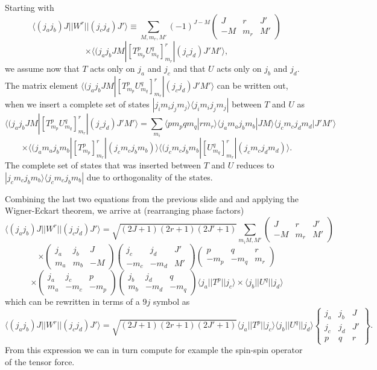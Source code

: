 Starting with
\[
\langle (j_aj_b)J||W^{r}||(j_cj_d)J'\rangle\equiv\sum_{M,m_r,M'}(-1)^{J-M}\left(\begin{array}{ccc}  J & r & J' \\ -M & m_r & M'\end{array}\right)
\]
\[
\times\langle (j_aj_bJM|\left[ T^{p}_{m_p}U^{q}_{m_q} \right]^{r}_{m_r}|(j_cj_d)J'M'\rangle,
\]
we assume now that $T$ acts only on $j_a$ and $j_c$ and that $U$ acts only on $j_b$ and $j_d$. 
The matrix element $\langle (j_aj_bJM|\left[ T^{p}_{m_p}U^{q}_{m_q} \right]^{r}_{m_r}|(j_cj_d)J'M'\rangle$ can be written out,
when we insert a complete set of states $|j_im_ij_jm_j\rangle\langle j_im_ij_jm_j|$ between $T$ and $U$ as
\[
\langle (j_aj_bJM|\left[ T^{p}_{m_p}U^{q}_{m_q} \right]^{r}_{m_r}|(j_cj_d)J'M'\rangle=\sum_{m_i}\langle pm_pqm_q|rm_r\rangle\langle j_am_aj_bm_b|JM\rangle\langle j_cm_cj_dm_d|J'M'\rangle
\]
\[
\times \langle (j_am_aj_bm_b|\left[ T^{p}_{m_p}\right]^{r}_{m_r}|(j_cm_cj_bm_b)\rangle\langle (j_cm_cj_bm_b|\left[ U^{q}_{m_q}\right]^{r}_{m_r}|(j_cm_cj_dm_d)\rangle.
\]
The complete set of states that was inserted between $T$ and $U$ reduces to $|j_cm_cj_bm_b\rangle\langle j_cm_cj_bm_b|$
due to orthogonality of the states. 

Combining the last two equations from the previous slide and 
and applying the Wigner-Eckart theorem, we arrive at (rearranging phase factors)
\[
\langle (j_aj_b)J||W^{r}||(j_cj_d)J'\rangle=\sqrt{(2J+1)(2r+1)(2J'+1)}\sum_{m_iM,M'}\left(\begin{array}{ccc}  J & r & J' \\ -M & m_r & M'\end{array}\right)
\]
\[
\times\left(\begin{array}{ccc} j_a  &j_b  & J \\ m_a &m_b &-M \end{array}\right)
\left(\begin{array}{ccc} j_c  &j_d  &J'  \\ -m_c &-m_d &M' \end{array}\right)
\left(\begin{array}{ccc} p  & q & r \\  -m_p&-m_q &m_r \end{array}\right)
\]
\[
\times\left(\begin{array}{ccc} j_a  &j_c  &p  \\ m_a &-m_c &-m_p \end{array}\right)\left(\begin{array}{ccc} j_b  &j_d  &q  \\ m_b &-m_d &-m_q \end{array}\right)\langle j_a||T^p||j_c\rangle \times \langle j_b||U^q||j_d\rangle
\]
which can be rewritten in terms of a $9j$ symbol as 
\[
\langle (j_aj_b)J||W^{r}||(j_cj_d)J'\rangle=\sqrt{(2J+1)(2r+1)(2J'+1)}\langle j_a||T^p||j_c\rangle  \langle j_b||U^q||j_d\rangle\left\{\begin{array}{ccc} j_a & j_b& J \\ j_c & j_d & J' \\ p & q& r\end{array}\right\}.
\]
From this expression we can in turn compute for example the spin-spin operator of the tensor force.

